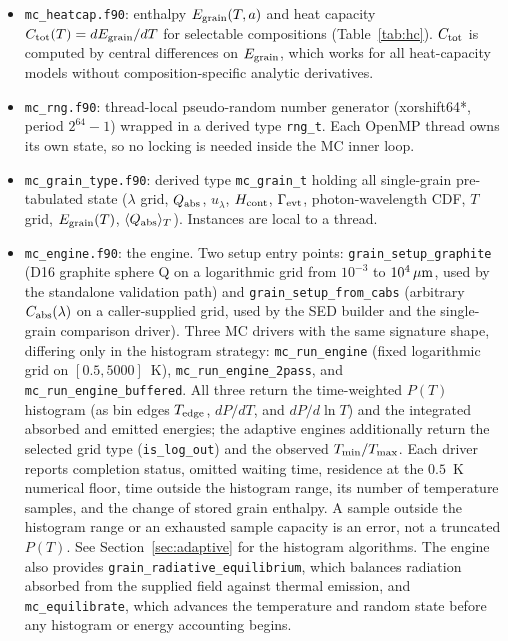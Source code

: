 \documentclass{my_memo}
\newcommand{\Cabs}{C_{\rm abs}}
\newcommand{\Qabs}{Q_{\rm abs}}
\newcommand{\QplT}{\langle Q_{\rm abs} \rangle_T}
\newcommand{\Ctot}{C_{\rm tot}}
\newcommand{\umc}{\,\mu{\rm m}}
\newcommand{\ulam}{u_\lambda}
\begin{document}
\begin{itemize}
\item \verb|mc_heatcap.f90|: enthalpy $E_{\rm grain}(T,a)$ and heat
  capacity $\Ctot(T)=dE_{\rm grain}/dT$ for selectable compositions
  (Table~\ref{tab:hc}).  $\Ctot$ is computed by central differences on
  $E_{\rm grain}$, which works for all heat-capacity models without
  composition-specific analytic derivatives.

\item \verb|mc_rng.f90|: thread-local pseudo-random number generator
  (\textsf{xorshift64*}, period $2^{64}-1$) wrapped in a derived type
  \verb|rng_t|.  Each OpenMP thread owns its own state, so no locking
  is needed inside the MC inner loop.

\item \verb|mc_grain_type.f90|: derived type \verb|mc_grain_t| holding
  all single-grain pre-tabulated state ($\lambda$ grid, $\Qabs$, $\ulam$,
  $H_{\rm cont}$, $\Gamma_{\rm evt}$, photon-wavelength CDF, $T$ grid,
  $E_{\rm grain}(T)$, $\QplT$).  Instances are local to a thread.

\item \verb|mc_engine.f90|: the engine.  Two setup entry points:
  \verb|grain_setup_graphite| (D16 graphite sphere Q on a logarithmic
  grid from $10^{-3}$ to $10^4\umc$, used by the standalone validation
  path) and \verb|grain_setup_from_cabs| (arbitrary $\Cabs(\lambda)$
  on a caller-supplied grid, used by the SED builder and the
  single-grain comparison driver).  Three MC drivers with the same
  signature shape, differing only in the histogram strategy:
  \verb|mc_run_engine| (fixed logarithmic grid on $[0.5, 5000]$~K),
  \verb|mc_run_engine_2pass|, and
  \verb|mc_run_engine_buffered|.  All three return the time-weighted
  $P(T)$ histogram (as bin edges $T_{\rm edge}$, $dP/dT$, and
  $dP/d\ln T$) and the integrated absorbed and emitted energies; the
  adaptive engines additionally return the selected grid type
  (\texttt{is\_log\_out}) and the observed $T_{\rm min}/T_{\rm max}$.
  Each driver reports completion status, omitted waiting time, residence
  at the $0.5$~K numerical floor, time outside the histogram range,
  its number of temperature samples, and the change of stored grain
  enthalpy. A sample outside the histogram range or an exhausted sample
  capacity is an error, not a truncated $P(T)$. See
  Section~\ref{sec:adaptive} for the histogram algorithms. The engine
  also provides \verb|grain_radiative_equilibrium|, which balances
  radiation absorbed from the supplied field against thermal emission,
  and \verb|mc_equilibrate|, which advances the temperature and random
  state before any histogram or energy accounting begins.


\end{itemize}
\end{document}
